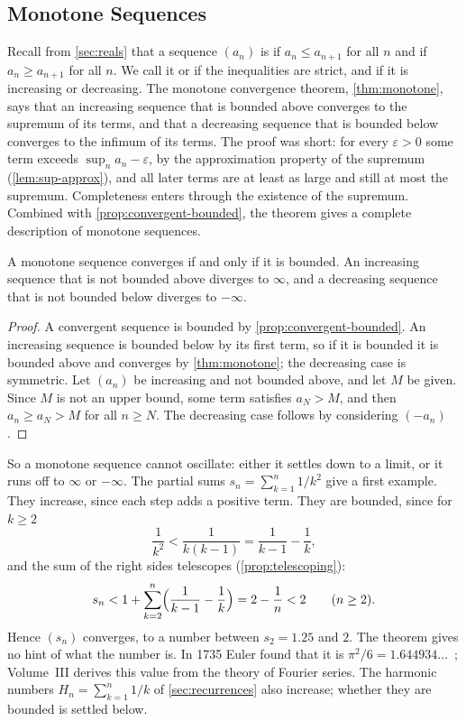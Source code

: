 \subsection{Monotone Sequences}

Recall from \cref{sec:reals} that a sequence $(a_n)$ is  if $a_n\le a_{n+1}$ for all $n$ and  if $a_n\ge a_{n+1}$ for all $n$. We call it  or  if the inequalities are strict, and  if it is increasing or decreasing. The monotone convergence theorem, \cref{thm:monotone}, says that an increasing sequence that is bounded above converges to the supremum of its terms, and that a decreasing sequence that is bounded below converges to the infimum of its terms. The proof was short: for every $\varepsilon>0$ some term exceeds $\sup_na_n-\varepsilon$, by the approximation property of the supremum (\cref{lem:sup-approx}), and all later terms are at least as large and still at most the supremum. Completeness enters through the existence of the supremum. Combined with \cref{prop:convergent-bounded}, the theorem gives a complete description of monotone sequences.

\begin{corollary}
\label{cor:monotone-dichotomy}
A monotone sequence converges if and only if it is bounded. An increasing sequence that is not bounded above diverges to $\infty$, and a decreasing sequence that is not bounded below diverges to $-\infty$.
\end{corollary}

\begin{proof}
A convergent sequence is bounded by \cref{prop:convergent-bounded}. An increasing sequence is bounded below by its first term, so if it is bounded it is bounded above and converges by \cref{thm:monotone}; the decreasing case is symmetric. Let $(a_n)$ be increasing and not bounded above, and let $M$ be given. Since $M$ is not an upper bound, some term satisfies $a_N>M$, and then $a_n\ge a_N>M$ for all $n\ge N$. The decreasing case follows by considering $(-a_n)$.
\end{proof}

So a monotone sequence cannot oscillate: either it settles down to a limit, or it runs off to $\infty$ or $-\infty$. The partial sums $s_n=\sum_{k=1}^n1/k^2$ give a first example. They increase, since each step adds a positive term. They are bounded, since for $k\ge2$
\[
\frac1{k^2}<\frac1{k(k-1)}=\frac1{k-1}-\frac1k ,
\]
and the sum of the right sides telescopes (\cref{prop:telescoping}):
\[
s_n<1+\sum_{k=2}^n\Bigl(\frac1{k-1}-\frac1k\Bigr)=2-\frac1n<2\qquad(n\ge2).
\]
Hence $(s_n)$ converges, to a number between $s_2=1.25$ and $2$. The theorem gives no hint of what the number is. In 1735 Euler found that it is $\pi^2/6=1.644934\ldots$~\cite{hairer1996analysis}; Volume~III derives this value from the theory of Fourier series. The harmonic numbers $H_n=\sum_{k=1}^n1/k$ of \cref{sec:recurrences} also increase; whether they are bounded is settled below.

